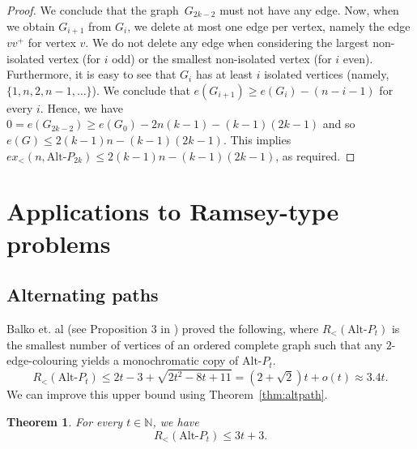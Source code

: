 \documentclass[11pt]{article}
\newtheorem{theorem}{Theorem}[section]
\theoremstyle{definition}
\begin{document}
\begin{proof}
We conclude that the graph~$G_{2k-2}$ must not have any edge.
Now, when we obtain $G_{i+1}$ from $G_i$, we delete at most one edge per vertex, namely the edge $vv^+$ for vertex $v$.
We do not delete any edge when considering the largest non-isolated vertex (for $i$ odd) or the smallest non-isolated vertex (for $i$ even).
Furthermore, it is easy to see that $G_i$ has at least $i$ isolated vertices (namely, $\{1,n,2,n-1,\dots\}$).
We conclude that $e(G_{i+1})\ge e(G_{i}) - (n - i - 1)$ for every $i$.
Hence, we have $0=e(G_{2k-2})\ge e(G_0) -2n(k-1)-(k-1)(2k-1)$ and so $e(G)\le 2(k-1)n-(k-1)(2k-1)$.
This implies $ex_<(n,\text{Alt-}P_{2k})\le 2(k-1)n -(k-1)(2k-1)$, as required.
\end{proof}

\section{Applications to Ramsey-type problems}\label{sec:appRamsey}

\subsection{Alternating paths}

Balko et. al (see Proposition 3 in \cite{bckk}) proved the following, where $R_<(\text{Alt-}P_t)$ is the smallest number of vertices of an ordered complete graph such that any $2$-edge-colouring yields a monochromatic copy of $\text{Alt-}P_t$.
$$R_<(\text{Alt-}P_t)\le2t-3+\sqrt{2t^2-8t+11}=(2+\sqrt2)t+o(t)\approx3.4t.$$
We can improve this upper bound using Theorem~\ref{thm:altpath}.

\begin{theorem}\label{thm:RamseyAltPaths}
For every $t\in\mathbb N$, we have
$$R_<(\text{Alt-}P_{t})\le3t+3.$$    
\end{theorem}
\end{document}
